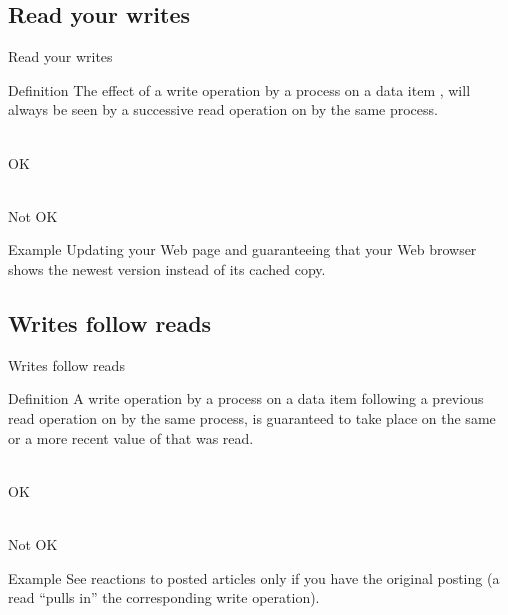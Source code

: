 \subsection{Read your writes}
\begin{slide}{Read your writes}
  \begin{block}{Definition}
    The effect of a write operation by a process on a data item , will always be seen by a successive read
    operation on  by the same process. 
  \end{block}
  \begin{centerfig}
     \\
    OK
  \end{centerfig}
  \vspace*{12pt}
  \begin{centerfig}
     \\
    Not OK
  \end{centerfig}
  \onslide
  \begin{exampleblock}{Example}
    Updating your Web page and guaranteeing that your Web browser shows the newest version instead of its
    cached copy.
  \end{exampleblock}
\end{slide}
\subsection{Writes follow reads}
\begin{slide}{Writes follow reads}
  \begin{block}{Definition}
    A write operation by a process on a data item  following a previous read operation on  by the same
    process, is guaranteed to take place on the same or a more recent value of  that was read.
  \end{block}
  \begin{centerfig}
     \\
    OK
  \end{centerfig}
  \vspace*{12pt}
  \begin{centerfig}
     \\
    Not OK
  \end{centerfig}
  \onslide
  \begin{exampleblock}{Example}
    See reactions to posted articles only if you have the original posting (a read ``pulls in'' the
    corresponding write operation).
  \end{exampleblock}
\end{slide}
